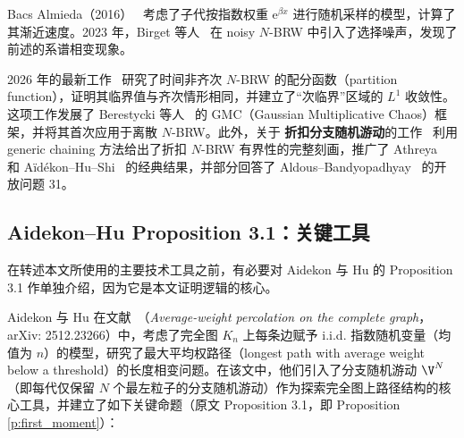 Bacs Almieda（2016）~\cite{bacsalmieda2016} 考虑了子代按指数权重 $\mathrm{e}^{\beta x}$ 进行随机采样的模型，计算了其渐近速度。2023 年，Birget 等人~\cite{birget2023} 在 noisy $N$-BRW 中引入了选择噪声，发现了前述的系谱相变现象。

2026 年的最新工作~\cite{aidekon2026partition} 研究了时间非齐次 $N$-BRW 的配分函数（partition function），证明其临界值与齐次情形相同，并建立了``次临界''区域的 $L^1$ 收敛性。这项工作发展了 Berestycki 等人~\cite{berestycki2013} 的 GMC（Gaussian Multiplicative Chaos）框架，并将其首次应用于离散 $N$-BRW。此外，关于 \textbf{折扣分支随机游动}的工作~\cite{aidekon2026discounted} 利用 generic chaining 方法给出了折扣 $N$-BRW 有界性的完整刻画，推广了 Athreya~\cite{athreya1985} 和 Aïdékon--Hu--Shi~\cite{aidekon2024} 的经典结果，并部分回答了 Aldous--Bandyopadhyay~\cite{aldous2005} 的开放问题 31。

\subsection{Aidekon--Hu Proposition 3.1：关键工具}
\label{ssec:aidekon_hu_prop31}

在转述本文所使用的主要技术工具之前，有必要对 Aidekon 与 Hu 的 Proposition 3.1 作单独介绍，因为它是本文证明逻辑的核心。

Aidekon 与 Hu 在文献~\cite{aidekon_hu_2025}（\textit{Average-weight percolation on the complete graph}，arXiv: 2512.23266）中，考虑了完全图 $K_n$ 上每条边赋予 i.i.d. 指数随机变量（均值为 $n$）的模型，研究了最大平均权路径（longest path with average weight below a threshold）的长度相变问题。在该文中，他们引入了分支随机游动 $\V^N$（即每代仅保留 $N$ 个最左粒子的分支随机游动）作为探索完全图上路径结构的核心工具，并建立了如下关键命题（原文 Proposition 3.1，即 Proposition \ref{p:first_moment}）：

\bigskip
\begin{center}
\end{center}
\bigskip

